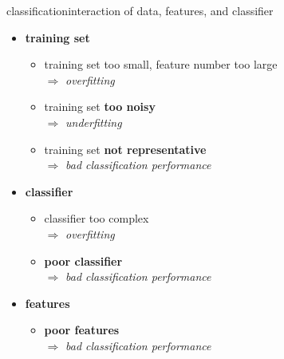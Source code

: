         \begin{frame}{classification}{interaction of data, features, and classifier}
            \vspace{-3mm}
            \begin{itemize}
                \item   \textbf{training set}
                    \begin{itemize}
                        \item	training set too small, feature number too large\\ $\Rightarrow$ \textit{overfitting}
                        \item<1->	training set \textbf{too noisy}\\ $\Rightarrow$ \textit{underfitting}
                        \item<1->	training set \textbf{not representative}\\ $\Rightarrow$ \textit{bad classification performance}
                    \end{itemize}
                \bigskip
                \item<2->   \textbf{classifier}
                    \begin{itemize}
                        \item<2->   classifier too complex\\ $\Rightarrow$ \textit{overfitting}
                        \item<2->	\textbf{poor classifier}\\ $\Rightarrow$ \textit{bad classification performance}
                    \end{itemize}
                \bigskip
                \item<3->   \textbf{features}
                    \begin{itemize}
                        \item<3->	\textbf{poor features}\\ $\Rightarrow$ \textit{bad classification performance}
                    \end{itemize}
            \end{itemize}
        \end{frame}

